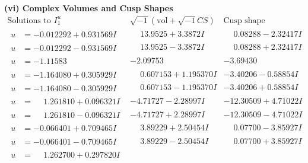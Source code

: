 \documentclass[1p]{elsarticle_modified}
\theoremstyle{definition}
\newcommand{\I}{\sqrt{-1}}
\begin{document}
\newpage\flushleft \textbf{(vi) Complex Volumes and Cusp Shapes}
$$\begin{array}{c|c|c}  
\text{Solutions to }I^u_{1}& \I (\text{vol} + \sqrt{-1}CS) & \text{Cusp shape}\\
 \hline 
\begin{aligned}
u &= -0.012292 + 0.931569 I\end{aligned}
 & \phantom{-}13.9525 + 3.3872 I & \phantom{-}0.08288 - 2.32417 I \\ \hline\begin{aligned}
u &= -0.012292 - 0.931569 I\end{aligned}
 & \phantom{-}13.9525 - 3.3872 I & \phantom{-}0.08288 + 2.32417 I \\ \hline\begin{aligned}
u &= -1.11583\phantom{ +0.000000I}\end{aligned}
 & -2.09753\phantom{ +0.000000I} & -3.69430\phantom{ +0.000000I} \\ \hline\begin{aligned}
u &= -1.164080 + 0.305929 I\end{aligned}
 & \phantom{-}0.607153 + 1.195370 I & -3.40206 - 0.58854 I \\ \hline\begin{aligned}
u &= -1.164080 - 0.305929 I\end{aligned}
 & \phantom{-}0.607153 - 1.195370 I & -3.40206 + 0.58854 I \\ \hline\begin{aligned}
u &= \phantom{-}1.261810 + 0.096321 I\end{aligned}
 & -4.71727 - 2.28997 I & -12.30509 + 4.71022 I \\ \hline\begin{aligned}
u &= \phantom{-}1.261810 - 0.096321 I\end{aligned}
 & -4.71727 + 2.28997 I & -12.30509 - 4.71022 I \\ \hline\begin{aligned}
u &= -0.066401 + 0.709465 I\end{aligned}
 & \phantom{-}3.89229 + 2.50454 I & \phantom{-}0.07700 - 3.85927 I \\ \hline\begin{aligned}
u &= -0.066401 - 0.709465 I\end{aligned}
 & \phantom{-}3.89229 - 2.50454 I & \phantom{-}0.07700 + 3.85927 I \\ \hline\begin{aligned}
u &= \phantom{-}1.262700 + 0.297820 I\end{aligned}

\end{array}$$
\end{document}
